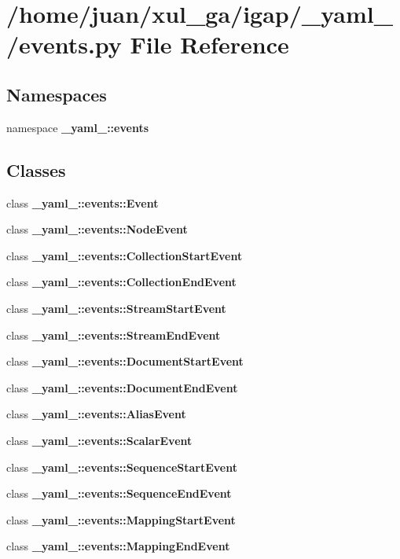 \section{/home/juan/xul\_\-ga/igap/\_\-yaml\_\-/events.py File Reference}
\label{events_8py}
\subsection*{Namespaces}
\begin{CompactItemize}
\item 
namespace {\bf \_\-yaml\_\-::events}
\end{CompactItemize}
\subsection*{Classes}
\begin{CompactItemize}
\item 
class {\bf \_\-yaml\_\-::events::Event}
\item 
class {\bf \_\-yaml\_\-::events::NodeEvent}
\item 
class {\bf \_\-yaml\_\-::events::CollectionStartEvent}
\item 
class {\bf \_\-yaml\_\-::events::CollectionEndEvent}
\item 
class {\bf \_\-yaml\_\-::events::StreamStartEvent}
\item 
class {\bf \_\-yaml\_\-::events::StreamEndEvent}
\item 
class {\bf \_\-yaml\_\-::events::DocumentStartEvent}
\item 
class {\bf \_\-yaml\_\-::events::DocumentEndEvent}
\item 
class {\bf \_\-yaml\_\-::events::AliasEvent}
\item 
class {\bf \_\-yaml\_\-::events::ScalarEvent}
\item 
class {\bf \_\-yaml\_\-::events::SequenceStartEvent}
\item 
class {\bf \_\-yaml\_\-::events::SequenceEndEvent}
\item 
class {\bf \_\-yaml\_\-::events::MappingStartEvent}
\item 
class {\bf \_\-yaml\_\-::events::MappingEndEvent}
\end{CompactItemize}
